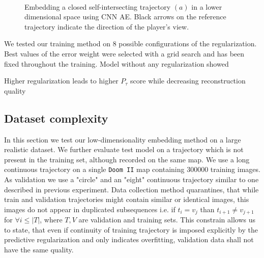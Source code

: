 \begin{figure}[t!]
	\centering
	\\
    	\caption{Embedding a closed self-intersecting trajectory $(a)$ in a lower dimensional space using CNN AE. Black arrows on the reference trajectory indicate the direction of the player's view.}
    	\label{fig:model_reco}
\end{figure}


We tested our training method on 8 possible configurations of the regularization. Best values of the error weight were selected with a grid search and has been fixed throughout the training. Model without any regularization showed

Higher regularization leads to higher $P_{\tau}$ score while decreasing reconstruction quality


\subsection{Dataset complexity}

In this section we test our low-dimensionality embedding method on a large realistic dataset. We further evaluate test model on a trajectory which is not present in the training set, although recorded on the same map. We use a long continuous trajectory on a single \texttt{Doom II} map containing 300000 training images.
As validation we use a "circle" and an "eight" continuous trajectory similar to one described in previous experiment.
Data collection method quarantines, that while train and validation trajectories might contain similar or identical images, this images do not appear in duplicated subsequences i.e. if $t_i = v_j$ than $t_{i+1} \neq v_{j+1}$ for $\forall i \leq |T|$, where $T, V$ are validation and training sets. This constrain allows us to state, that even if continuity of training trajectory is imposed explicitly by the predictive regularization and only indicates overfitting, validation data shall not have the same quality.

